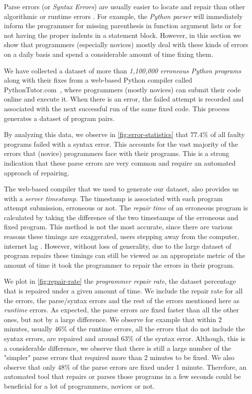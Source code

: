 Parse errors (or \emph{Syntax Errors}) are usually easier to locate and repair
than other algorithmic or runtime errors \citep{Denny_2012}. For example, the
\emph{Python parser} will immediately inform the programmer for missing
parenthesis in function argument lists or for not having the proper indents in a
statement block. However, in this section we show that programmers (especially
novices) mostly deal with these kinds of errors on a daily basis and spend a
considerable amount of time fixing them.

We have collected a dataset of more than \emph{1,100,000 erroneous Python
programs} along with their fixes from a web-based Python compiler called
PythonTutor.com~\citep{Guo2013}, where programmers (mostly novices) can submit
their code online and execute it. When there is an error, the failed attempt is
recorded and associated with the next successful run of the same fixed code.
This process generates a dataset of program pairs.

By analyzing this data, we observe in \autoref{fig:error-statistics} that $77.4
\% $ of all faulty programs failed with a syntax error. This accounts for the
vast majority of the errors that (novice) programmers face with their programs.
This is a strong indication that these parse errors are very common and require
an automated approach of repairing.

The web-based compiler that we used to generate our dataset, also provides us
with a \emph{server timestamp}. The timestamp is associated with each program
attempt submission, erroneous or not. The \emph{repair time} of an erroneous
program is calculated by taking the difference of the two timestamps of the
erroneous and fixed program. This method is not the most accurate, since there
are various reasons these timings are exaggerated, \eg users stepping away from
the computer, internet lag \etc. However, without loss of generality, due to the
large dataset of program repairs these timings can still be viewed as an
appropriate metric of the amount of time it took the programmer to repair the
errors in their program.

We plot in \autoref{fig:repair-rate} the \emph{programmer repair rate}, \ie the
dataset percentage that is repaired under a given amount of time. We include the
repair rate for all the errors, the parse/syntax errors and the rest of the
errors mentioned here as \emph{runtime} errors. As expected, the parse errors
are fixed faster than all the other ones, but not by a large difference. We
observe for example that within 2 minutes, usually $46\%$ of the runtime
errors, \ie all the errors that do not include the syntax errors, are repaired
and around $63\%$ of the syntax error. Although, this is a considerable
difference, we observe that there is still a large number of the "simpler" parse
errors that required more than 2 minutes to be fixed. We also observe that only
$48\%$ of the parse errors are fixed under 1 minute. Therefore, an automated
tool that repairs or parses those programs in a few seconds could be beneficial
for a lot of programmers, novices or not.

